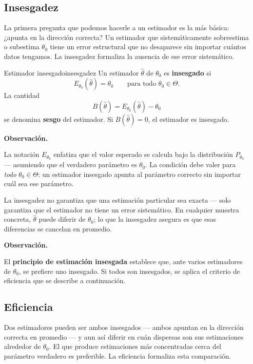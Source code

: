\documentclass[12pt, a4paper]{book}
\newenvironment{observacion}{%
    \par\medskip\noindent\textbf{\color{azul}Observaci\'{o}n.}\enspace\itshape
}{\par\medskip}
\numberwithin{equation}{chapter}
\begin{document}
\subsection{Insesgadez}

La primera pregunta que podemos hacerle a un estimador es
la más básica: ¿apunta en la dirección correcta? Un
estimador que sistemáticamente sobreestima o subestima
$\theta_0$ tiene un error estructural que no desaparece
sin importar cuántos datos tengamos. La insesgadez
formaliza la ausencia de ese error sistemático.

\begin{definicion}{Estimador insesgado}{insesgadez}
	Un estimador $\hat{\theta}$ de $\theta_0$ es
	\textbf{insesgado} si
	\[
	E_{\theta_0}(\hat{\theta}) = \theta_0
	\qquad \text{para todo } \theta_0 \in \Theta.
	\]
	La cantidad
	\[
	B(\hat{\theta}) = E_{\theta_0}(\hat{\theta}) - \theta_0
	\]
	se denomina \textbf{sesgo} del estimador. Si
	$B(\hat{\theta}) = 0$, el estimador es insesgado.
\end{definicion}

\begin{observacion}
	La notación $E_{\theta_0}$ enfatiza que el valor esperado
	se calcula bajo la distribución $P_{\theta_0}$ ---
	asumiendo que el verdadero parámetro es $\theta_0$. La
	condición debe valer para \emph{todo} $\theta_0 \in
	\Theta$: un estimador insesgado apunta al parámetro
	correcto sin importar cuál sea ese parámetro.
	
	La insesgadez no garantiza que una estimación particular
	sea exacta --- solo garantiza que el estimador no tiene
	un error sistemático. En cualquier muestra concreta,
	$\hat{\theta}$ puede diferir de $\theta_0$; lo que la
	insesgadez asegura es que esas diferencias se cancelan
	en promedio.
\end{observacion}

\begin{observacion}
	El \textbf{principio de estimación insesgada} establece
	que, ante varios estimadores de $\theta_0$, se prefiere
	uno insesgado. Si todos son insesgados, se aplica el
	criterio de eficiencia que se describe a continuación.
\end{observacion}

\subsection{Eficiencia}

Dos estimadores pueden ser ambos insesgados --- ambos
apuntan en la dirección correcta en promedio --- y aun así
diferir en cuán dispersas son sus estimaciones alrededor
de $\theta_0$. El que produce estimaciones más concentradas
cerca del parámetro verdadero es preferible. La eficiencia
formaliza esta comparación.
\end{document}
